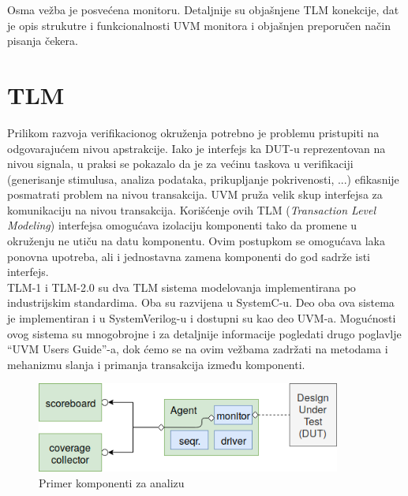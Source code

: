 %
% 

Osma vežba je posvećena monitoru. Detaljnije su objašnjene TLM konekcije, dat je
opis strukutre i funkcionalnosti UVM monitora i objašnjen preporučen način
pisanja čekera.


\section{TLM}

Prilikom razvoja verifikacionog okruženja potrebno je problemu pristupiti na
odgovarajućem nivou apstrakcije. Iako je interfejs ka DUT-u reprezentovan na
nivou signala, u praksi se pokazalo da je za većinu taskova u verifikaciji
(generisanje stimulusa, analiza podataka, prikupljanje pokrivenosti, ...)
efikasnije posmatrati problem na nivou transakcija. UVM pruža velik skup
interfejsa za komunikaciju na nivou transakcija. Korišćenje ovih TLM
(\emph{Transaction Level Modeling}) interfejsa omogućava izolaciju komponenti
tako da promene u okruženju ne utiču na datu komponentu. Ovim postupkom se
omogućava laka ponovna upotreba, ali i jednostavna zamena komponenti do god
sadrže isti interfejs.\\

TLM-1 i TLM-2.0 su dva TLM sistema modelovanja implementirana po industrijskim
standardima. Oba su razvijena u SystemC-u. Deo oba ova sistema je implementiran
i u SystemVerilog-u i dostupni su kao deo UVM-a. Mogućnosti ovog sistema su
mnogobrojne i za detaljnije informacije pogledati drugo poglavlje ``UVM Users
Guide''-a, dok ćemo se na ovim vežbama zadržati na metodama i mehanizmu slanja i
primanja transakcija između komponenti.\\

\begin{figure}[h!]
  \centering
  \includegraphics[width=100mm]{img/v8_analysis_components.png}
  \caption{Primer komponenti za analizu}
  \label{fig:analysis_components}
\end{figure}

